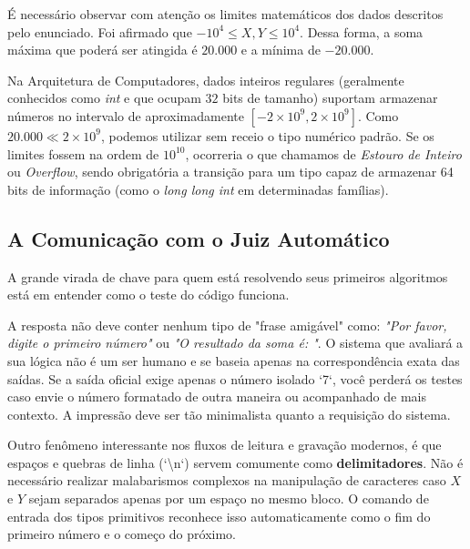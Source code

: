 \documentclass[11pt]{article}
\begin{document}
\begin{notebox}
É necessário observar com atenção os limites matemáticos dos dados descritos pelo enunciado. Foi afirmado que $-10^4 \leq X, Y \leq 10^4$. Dessa forma, a soma máxima que poderá ser atingida é $20.000$ e a mínima de $-20.000$.

Na Arquitetura de Computadores, dados inteiros regulares (geralmente conhecidos como \textit{int} e que ocupam $32$ bits de tamanho) suportam armazenar números no intervalo de aproximadamente $[-2 \times 10^9, 2 \times 10^9]$. Como $20.000 \ll 2 \times 10^9$, podemos utilizar sem receio o tipo numérico padrão. Se os limites fossem na ordem de $10^{10}$, ocorreria o que chamamos de \textit{Estouro de Inteiro} ou \textit{Overflow}, sendo obrigatória a transição para um tipo capaz de armazenar 64 bits de informação (como o \textit{long long int} em determinadas famílias).
\end{notebox}

\subsection*{A Comunicação com o Juiz Automático}

A grande virada de chave para quem está resolvendo seus primeiros algoritmos está em entender como o teste do código funciona.

\begin{warnbox}
A resposta não deve conter nenhum tipo de "frase amigável" como: \textit{"Por favor, digite o primeiro número"} ou \textit{"O resultado da soma é: "}. O sistema que avaliará a sua lógica não é um ser humano e se baseia apenas na correspondência exata das saídas. Se a saída oficial exige apenas o número isolado `7`, você perderá os testes caso envie o número formatado de outra maneira ou acompanhado de mais contexto. A impressão deve ser tão minimalista quanto a requisição do sistema.
\end{warnbox}

Outro fenômeno interessante nos fluxos de leitura e gravação modernos, é que espaços e quebras de linha (`\textbackslash n`) servem comumente como \textbf{delimitadores}. Não é necessário realizar malabarismos complexos na manipulação de caracteres caso $X$ e $Y$ sejam separados apenas por um espaço no mesmo bloco. O comando de entrada dos tipos primitivos reconhece isso automaticamente como o fim do primeiro número e o começo do próximo.
\end{document}
